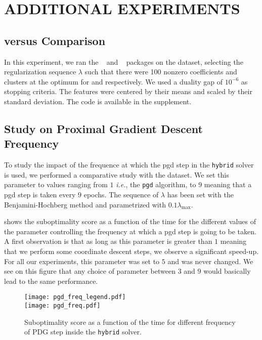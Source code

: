 \section{ADDITIONAL EXPERIMENTS}\label{sec:add_expes}

\subsection{ versus  Comparison}
\label{sec:slope-vs-glmnet}

In this experiment, we ran the ~\parencite{friedman2022} and ~\parencite{larsson2022d} packages on the  dataset, selecting the regularization sequence \(\lambda\) such that there were 100 nonzero coefficients and clusters at the optimum for  and  respectively.
We used a duality gap of \(10^{-6}\) as stopping criteria.
The features were centered by their means and scaled by their standard deviation.
The code is available in the supplement.

\subsection{Study on Proximal Gradient Descent Frequency}
\label{sec:pgd-freq-study}

To study the impact of the frequence at which the pgd step in the \texttt{hybrid} solver is used, we performed a comparative study with the  dataset.
We set this parameter to values ranging from $1$ \textit{i.e.}, the \texttt{pgd} algorithm, to 9 meaning that a pgd step is taken every $9$ epochs.
The sequence of $\lambda$ has been set with the Benjamini-Hochberg method and parametrized with $0.1 \lambda_{\text{max}}$.

 shows the suboptimality score as a function of the time for the different values of the parameter controlling the frequency at which a pgd step is going to be taken.
A first observation is that as long as this parameter is greater than $1$ meaning that we perform some coordinate descent steps, we observe a significant speed-up.
For all our experiments, this parameter was set to $5$ and was never changed.
We see on this figure that any choice of parameter between $3$ and $9$ would basically lead to the same performance.

\begin{figure*}[htb]
  \centering
  \texttt{[image: pgd\_freq\_legend.pdf]} \\
  \texttt{[image: pgd\_freq.pdf]}
  \caption{Suboptimality score as a function of the time for different frequency of PDG step inside the \texttt{hybrid} solver.}
  \label{fig:pgd_freq}
\end{figure*}

